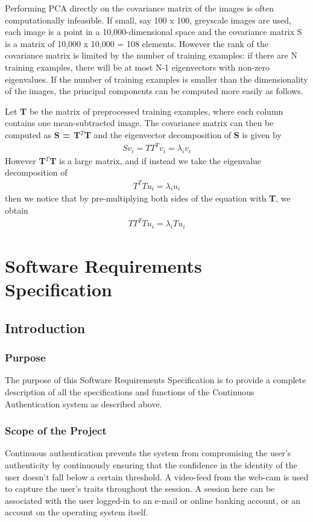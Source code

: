 \documentclass[12pt]{article}			%
\begin{document}

Performing PCA directly on the covariance matrix of the images is often computationally infeasible. If small, say 100 x 100, greyscale images are used, each image is a point in a 10,000-dimensional space and the covariance matrix S is a matrix of 10,000 x 10,000 = 108 elements. However the rank of the covariance matrix is limited by the number of training examples: if there are N training examples, there will be at most N-1 eigenvectors with non-zero eigenvalues. If the number of training examples is smaller than the dimensionality of the images, the principal components can be computed more easily as follows.

Let {\bf T} be the matrix of preprocessed training examples, where each column contains one mean-subtracted image. The covariance matrix can then be computed as {\bf S = T$^{T}$T} and the eigenvector decomposition of {\bf S} is given by\\
\begin{align*}
Sv_{i} = TT^{T}v_{i} = \lambda_{i}v_{i}
\end{align*}
However {\bf T$^{T}$T } is a large matrix, and if instead we take the eigenvalue decomposition of
\begin{align*}
T^{T}Tu_{i} = \lambda_{i}u_{i}
\end{align*}
then we notice that by pre-multiplying both sides of the equation with {\bf T}, we obtain
\begin{align*}
TT^{T}Tu_{i} = \lambda_{i}Tu_{i}
\end{align*}

\section{Software Requirements Specification }
\subsection{ Introduction }

\subsubsection{ Purpose }
The purpose of this Software Requirements Specification is to provide a complete description of all the specifications and functions of the Continuous Authentication system as described above.

\subsubsection{ Scope of the Project }
Continuous authentication prevents the system from compromising the user's authenticity by continuously ensuring that the confidence in the identity of the user doesn't fall below a certain threshold. A video-feed from the web-cam is used to capture the user's traits throughout the session. A session here can be associated with the user logged-in to an e-mail or online banking account, or an account on the operating system itself.
\end{document}
